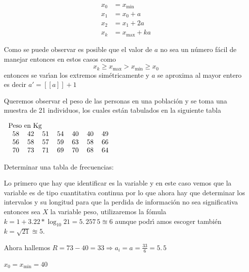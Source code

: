 %

\begin{align*}
x_{0}  &  =x_{\min}\\
x_{1}  &  =x_{0}+a\\
x_{2}  &  =x_{1}+2a\\
x_{k}  &  =x_{\max}+ka
\end{align*}


Como se puede observar es posible que el valor de $a$ no sea un n\'{u}mero
f\'{a}cil de manejar entonces en estos casos como
\[
x_{k}\geq x_{\max}>x_{\min}\geq x_{0}
\]
entonces se var\'{\i}an los extremos sim{\'e}tricamente y $a$ se aproxima al
mayor entero es decir $a\prime=\left[  \left[  a\right]  \right]  +1$

\begin{example}
Queremos observar el peso de las personas en una poblaci\'{o}n y se toma una
muestra de 21 individuos, los cuales est{\'a}n tabulados en la siguiente tabla
\end{example}

$
\begin{tabular}
[c]{l}%
Peso en Kg\\%
\begin{tabular}
[c]{lllllll}%
58 & 42 & 51 & 54 & 40 & 40 & 49\\
56 & 58 & 57 & 59 & 63 & 58 & 66\\
70 & 73 & 71 & 69 & 70 & 68 & 64
\end{tabular}
\end{tabular}
$

Determinar una tabla de frecuencias:

\begin{solution}
Lo primero que hay que identificar es la variable y en este caso vemos que la
variable es de tipo cuantitativa continua por lo que ahora hay que determinar
los intervalos y su longitud para que la perdida de informaci\'{o}n no sea
significativa entonces sea $X$ la variable peso, utilizaremos la f\'{o}mula
$k=1+3.22\ast\log_{10}21=5.\,\allowbreak257\,5\approxeq6$ aunque podr{\'\i
}amos escoger tambi\'{e}n $k=\sqrt{21}\approxeq5$.
\end{solution}

Ahora hallemos $R=73-40=33\Longrightarrow a_{i}=a=\frac{33}{6}=5.\,\allowbreak
5$

$x_{0}=x_{\min}=40$

